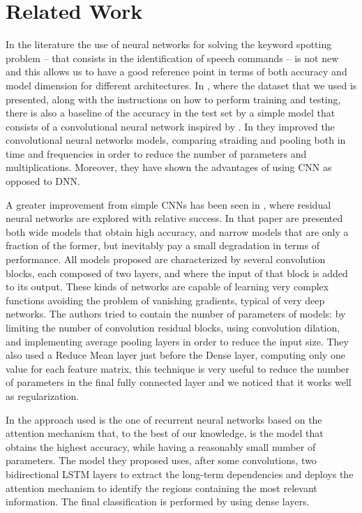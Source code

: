 
\section{Related Work}
\label{sec:related_work}

In the literature the use of neural networks for solving the keyword spotting problem -- that consists in the identification of speech commands -- is not new and this allows us to have a good reference point in terms of both accuracy and model dimension for different architectures. In \cite{4}, where the dataset that we used is presented, along with the instructions on how to perform training and testing, there is also a baseline of the accuracy in the test set by a simple model that consists of a convolutional neural network inspired by \cite{10}. In \cite{3} they improved the convolutional neural networks models, comparing straiding and pooling both in time and frequencies in order to reduce the number of parameters and multiplications. Moreover, they have shown the advantages of using CNN as opposed to DNN.


A greater improvement from simple CNNs has been seen in \cite{2}, where residual neural networks are explored with relative success. In that paper are presented both wide models that obtain high accuracy, and narrow models that are only a fraction of the former, but inevitably pay a small degradation in terms of performance.
All models proposed are characterized by several convolution blocks, each composed of two layers, and where the input of that block is added to its output. These kinds of networks are capable of learning very complex functions avoiding the problem of vanishing gradients, typical of very deep networks. The authors tried to contain the number of parameters of models: by limiting the number of convolution residual blocks, using convolution dilation, and implementing average pooling layers in order to reduce the input size.
They also used a Reduce Mean layer just before the Dense layer, computing only one value for each feature matrix, this technique is very useful to reduce the number of parameters in the final fully connected layer and we noticed that it works well as regularization.


In \cite{1} the approach used is the one of recurrent neural networks based on the attention mechanism that, to the best of our knowledge, is the model that obtains the highest accuracy, while having a reasonably small number of parameters. The model they proposed uses, after some convolutions, two bidirectional LSTM layers to extract the long-term dependencies and deploys the attention mechanism to identify the regions containing the most relevant information. The final classification is performed by using dense layers.


